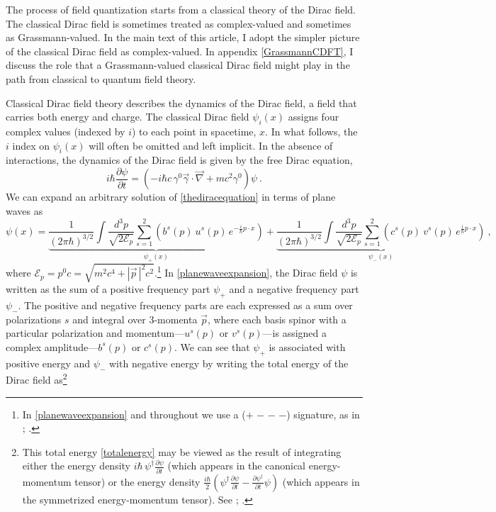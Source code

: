 \documentclass[onecolumn,secnumarabic,amsmath,amssymb,balancelastpage,nofootinbib]{article}
\begin{document}
The process of field quantization starts from a classical theory of the Dirac field.  The classical Dirac field is sometimes treated as complex-valued and sometimes as Grassmann-valued.  In the main text of this article, I adopt the simpler picture of the classical Dirac field as complex-valued.  In appendix \ref{GrassmannCDFT}, I discuss the role that a Grassmann-valued classical Dirac field might play in the path from classical to quantum field theory.

Classical Dirac field theory describes the dynamics of the Dirac field, a field that carries both energy and charge.  The classical Dirac field $\psi_i(x)$ assigns four complex values (indexed by $i$) to each point in spacetime, $x$.  In what follows, the $i$ index on $\psi_i(x)$ will often be omitted and left implicit.  In the absence of interactions, the dynamics of the Dirac field is given by the free Dirac equation,
\begin{equation}
i\hbar \frac{\partial \psi}{\partial t}=\left(-i\hbar c \, \gamma^0 \vec{\gamma}\cdot\vec{\nabla}+ mc^2 \gamma^0 \right)\psi
\ .
\label{thediracequation}
\end{equation}
We can expand an arbitrary solution of \eqref{thediracequation} in terms of plane waves as
\begin{equation}
\psi (x) =\underbrace{\frac{1}{(2\pi\hbar)^{3/2}}\int{ \frac{d^3 p}{\sqrt{2 \mathcal{E}_p}} \sum_{s=1}^2 \left(b^s (p) \: u^s (p) \, e^{-\frac{i}{\hbar} p \cdot x}\right)}}_{\mbox{$\psi_+(x)$}}
+\underbrace{\frac{1}{(2\pi\hbar)^{3/2}}\int{ \frac{d^3 p}{\sqrt{2 \mathcal{E}_p}} \sum_{s=1}^2 \left(c^s (p) \: v^s (p) \,  e^{\frac{i}{\hbar} p \cdot x}\right)}}_{\mbox{$\psi_-(x)$}}
\ ,
\label{planewaveexpansion}
\end{equation}
where $\mathcal{E}_p = p^0 c = \sqrt{m^2 c^4 + |\vec{p}\,|^2 c^2}$.\footnote{In \eqref{planewaveexpansion} and throughout we use a ($+$ $-$ $-$ $-$) signature, as in \citet{bjorkendrell, bjorkendrellfields}; \citet{peskinschroeder}.}  In \eqref{planewaveexpansion}, the Dirac field $\psi$ is written as the sum of a positive frequency part $\psi_+$ and a negative frequency part $\psi_-$.  The positive and negative frequency parts are each expressed as a sum over polarizations $s$ and integral over 3-momenta $\vec{p}$, where each basis spinor with a particular polarization and momentum---$u^s (p)$ or $v^s (p)$---is assigned a complex amplitude---$b^s (p)$ or $c^s (p)$.  We can see that $\psi_+$ is associated with positive energy and $\psi_-$ with negative energy by writing the total energy of the Dirac field as\footnote{This total energy \eqref{totalenergy} may be viewed as the result of integrating either the energy density $i \hbar \, \psi^\dagger\frac{\partial \psi}{\partial t}$ (which appears in the canonical energy-momentum tensor) or the energy density $\frac{i \hbar}{2}\left(\psi^\dagger\frac{\partial \psi}{\partial t}-\frac{\partial \psi^\dagger}{\partial t}\psi\right)$ (which appears in the symmetrized energy-momentum tensor).  See \citet[pg.\ 419]{heitler}; \citet[pg.\ 219]{schweberQFT}.\label{twodensities}}
\end{document}
